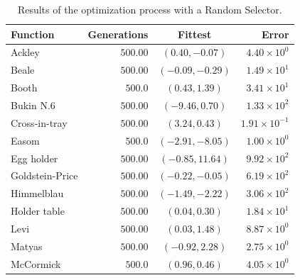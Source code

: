       \centering
      \begin{longtable}{|l|r|c|r|}
        \caption{Results of the optimization process with a Random Selector.}\\
        \hline
        Function  & Generations & Fittest & Error \\
        \hline\hline
        Ackley	          & $500.00$	
                          & $(0.40, -0.07)$	
                          & $4.40 \times 10^0$\\\hline
        Beale	            & $500.00$	
                          & $(-0.09, -0.29)$	
                          & $1.49 \times 10^1$\\\hline
        Booth	            & $500.0$
                          & $(0.43, 1.39)$	
                          & $3.41 \times 10^1$\\\hline
        Bukin N.6	        & $500.00$	
                          & $(-9.46, 0.70)$	
                          & $1.33 \times 10^2$\\\hline
        Cross-in-tray	    & $500.00$	
                          & $(3.24, 0.43)$	
                          & $1.91 \times 10^{-1}$\\\hline
        Easom	            & $500.0$	
                          & $(-2.91, -8.05)$	
                          & $1.00 \times 10^0$\\\hline
        Egg holder	      & $500.00$	
                          & $(-0.85, 11.64)$	
                          & $9.92 \times 10^2$\\\hline
        Goldstein-Price	  & $500.00$	
                          & $(-0.22, -0.05)$	
                          & $6.19 \times 10^2$\\\hline
        Himmelblau	      & $500.00$	
                          & $(-1.49, -2.22)$	
                          & $3.06 \times 10^2$\\\hline
        Holder table	    & $500.00$	
                          & $(0.04, 0.30)$	
                          & $1.84 \times 10^1$\\\hline
        Levi	            & $500.00$	
                          & $(0.03, 1.48)$	
                          & $8.87 \times 10^0$\\\hline
        Matyas	          & $500.00$	
                          & $(-0.92, 2.28)$	
                          & $2.75 \times 10^0$\\\hline
        McCormick	        & $500.0$	
                          & $(0.96, 0.46)$	
                          & $4.05 \times 10^0$\\\hline

\end{longtable}
